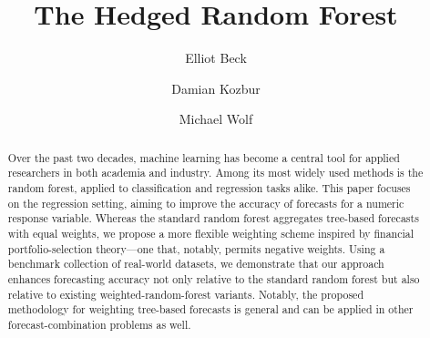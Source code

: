 \documentclass[12pt]{article}
\numberwithin{equation}{section}
\theoremstyle{plain}
\begin{document}
\title{The Hedged Random Forest}

\author[1, 3]{Elliot Beck}
\author[2]{Damian Kozbur}
\author[2, 4]{Michael Wolf}





\date{}  

\maketitle


\begin{abstract}
Over the past two decades, machine learning has become a central tool for applied researchers in both academia and industry. Among its most widely used methods is the random forest, applied to classification and regression tasks alike. This paper focuses on the regression setting, aiming to improve the accuracy of forecasts for a numeric response variable. Whereas the standard random forest aggregates tree-based forecasts with equal weights, we propose a more flexible weighting scheme inspired by financial portfolio-selection theory---one that, notably, permits negative weights. Using a benchmark collection of real-world datasets, we demonstrate that our approach enhances forecasting accuracy not only relative to the standard random forest but also relative to existing weighted-random-forest variants. Notably, the proposed methodology for weighting tree-based forecasts 
is general and can be applied in other forecast-combination problems as well.
\end{abstract}
\end{document}
